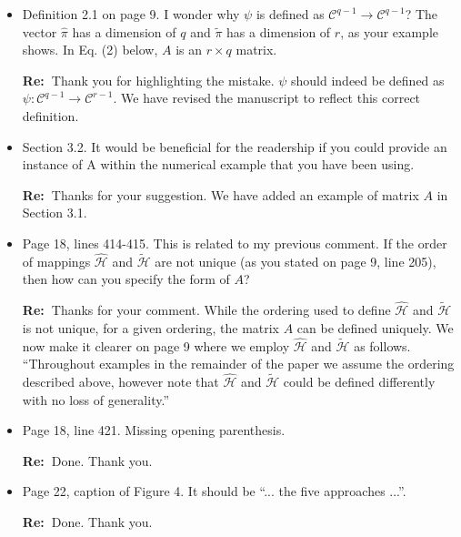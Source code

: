 \documentclass[11pt,a4paper]{article}
\newcommand{\RE}[2][Re:~]{{\color{blue}\textbf{#1}#2}}
\begin{document}
\begin{itemize}
    \item Definition 2.1 on page 9. I wonder why $\psi$ is defined as $\mathcal{C}^{q-1} \rightarrow \mathcal{C}^{q-1}$? The vector $\hat \pi$ has a dimension of $q$ and $\tilde{\pi}$ has a dimension of $r$, as your example shows. In Eq. (2) below, $A$ is an $r\times q$ matrix.
    
    \RE{Thank you for highlighting the mistake. $\psi$ should indeed be defined as $\psi: \mathcal{C}^{q-1} \rightarrow \mathcal{C}^{r-1}$. We have revised the manuscript to reflect this correct definition.}

    \item Section 3.2. It would be beneficial for the readership if you could provide an instance of A within the numerical example that you have been using.
    
    \RE{Thanks for your suggestion. We have added an example of matrix $A$ in Section 3.1.}

    \item Page 18, lines 414-415. This is related to my previous comment. If the order of mappings $\hat{\mathcal{H}}$ and $\tilde{\mathcal{H}}$ are not unique (as you stated on page 9, line 205), then how can you specify the form of $A$?
    
    \RE{Thanks for your comment. While the ordering used to define $\hat{\mathcal{H}}$ and $\tilde{\mathcal{H}}$ is not unique, for a given ordering, the matrix $A$ can be defined uniquely. We now make it clearer on page 9 where we employ $\hat{\mathcal{H}}$ and $\tilde{\mathcal{H}}$ as follows. ``Throughout examples in the remainder of the paper we assume the ordering described above, however note that $\hat{\mathcal{H}}$ and $\tilde{\mathcal{H}}$ could be defined differently with no loss of generality.''}
    
    

    \item Page 18, line 421. Missing opening parenthesis.
    
    \RE{Done. Thank you.}
    \item Page 22, caption of Figure 4. It should be ``... the five approaches ...''.
    
    \RE{Done. Thank you.}
\end{itemize}


\newpage


% 
% 
\printbibliography
\end{document}
